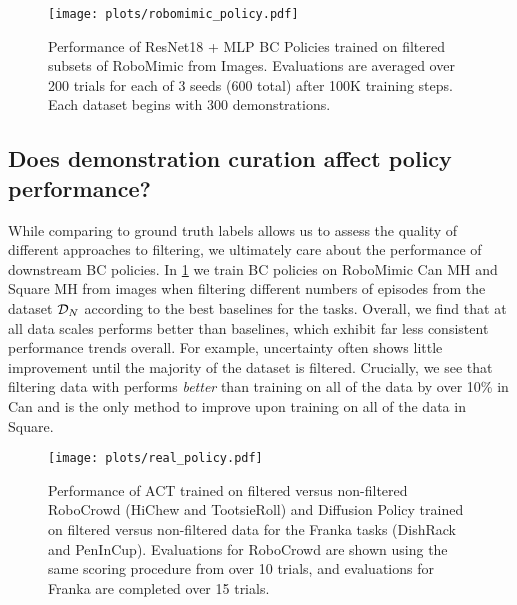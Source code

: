 \begin{figure}
    \centering
    \texttt{[image: plots/robomimic\_policy.pdf]}
    \vspace{-0.2in}
    \caption{Performance of ResNet18 + MLP BC Policies trained on filtered subsets of RoboMimic from Images. Evaluations are averaged over 200 trials for each of 3 seeds (600 total) after 100K training steps. Each dataset begins with 300 demonstrations.}
    \label{fig:robomimic_policy}
\end{figure}

\subsection{Does demonstration curation affect policy performance?}
While comparing to ground truth labels allows us to assess the quality of different approaches to filtering, we ultimately care about the performance of downstream BC policies. In \cref{fig:robomimic_policy} we train BC policies on RoboMimic Can MH and Square MH from images when filtering different numbers of episodes from the dataset $\mathcal{D}_N$ according to the best baselines for the tasks. Overall, we find that at all data scales \abv performs better than baselines, which exhibit far less consistent performance trends overall. For example, uncertainty often shows little improvement until the majority of the dataset is filtered. Crucially, we see that filtering data with \abv performs \emph{better} than training on all of the data by over 10\% in Can and is the only method to improve upon training on all of the data in Square. 


\begin{figure*}[t]
    \centering
    \texttt{[image: plots/real\_policy.pdf]}
    \vspace{-0.1in}
    \caption{Performance of ACT trained on filtered versus non-filtered RoboCrowd (HiChew and TootsieRoll) and Diffusion Policy trained on filtered versus non-filtered data for the Franka tasks (DishRack and PenInCup). Evaluations for RoboCrowd are shown using the same scoring procedure from \citet{mirchandani2024robocrowd} over 10 trials, and evaluations for Franka are completed over 15 trials.}
    \label{fig:robocrowd_policy}
\end{figure*}

